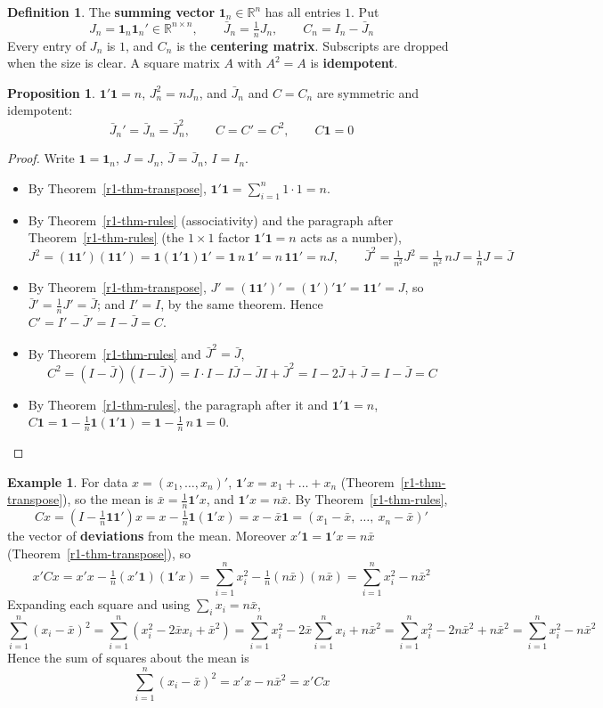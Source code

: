 \documentclass[12pt]{article}
\newcommand{\R}{\mathbb R}
\newcommand{\one}{\mathbf 1}
\theoremstyle{definition}
\newtheorem{proposition}[theorem]{Proposition}
\newtheorem{definition}[theorem]{Definition}
\newtheorem{example}[theorem]{Example}
\begin{document}
\begin{definition}\label{r1-def-ones}
The \textbf{summing vector} \(\one_n\in\R^n\) has all entries \(1\). Put
\[
J_n=\one_n\one_n'\in\R^{n\times n},\qquad \bar J_n=\tfrac1nJ_n,\qquad C_n=I_n-\bar J_n
\]
Every entry of \(J_n\) is \(1\), and \(C_n\) is the \textbf{centering matrix}. Subscripts are
dropped when the size is clear. A square matrix \(A\) with \(A^2=A\) is \textbf{idempotent}.
\end{definition}

\begin{proposition}\label{r1-prop-centering}
\(\one'\one=n\), \(J_n^2=nJ_n\), and \(\bar J_n\) and \(C=C_n\) are symmetric and
idempotent:
\[
\bar J_n'=\bar J_n=\bar J_n^2,\qquad C=C'=C^2,\qquad C\one=0
\]
\end{proposition}
\begin{proof}
Write \(\one=\one_n\), \(J=J_n\), \(\bar J=\bar J_n\), \(I=I_n\).
\begin{itemize}
\item By Theorem~\ref{r1-thm-transpose}, \(\one'\one=\sum_{i=1}^n1\cdot1=n\).
\item By Theorem~\ref{r1-thm-rules} (associativity) and the paragraph after Theorem~\ref{r1-thm-rules} (the
\(1\times1\) factor \(\one'\one=n\) acts as a number),
\[
J^2=(\one\one')(\one\one')=\one(\one'\one)\one'=\one\,n\,\one'=n\,\one\one'=nJ,\qquad
\bar J^2=\tfrac1{n^2}J^2=\tfrac1{n^2}\,nJ=\tfrac1nJ=\bar J
\]
\item By Theorem~\ref{r1-thm-transpose}, \(J'=(\one\one')'=(\one')'\one'=\one\one'=J\), so
\(\bar J'=\frac1nJ'=\bar J\); and \(I'=I\), by the same theorem. Hence \(C'=I'-\bar J'=I-\bar J=C\).
\item By Theorem~\ref{r1-thm-rules} and \(\bar J^2=\bar J\),
\[
C^2=(I-\bar J)(I-\bar J)=I\cdot I-I\bar J-\bar JI+\bar J^2=I-2\bar J+\bar J=I-\bar J=C
\]
\item By Theorem~\ref{r1-thm-rules}, the paragraph after it and \(\one'\one=n\),
\(C\one=\one-\frac1n\one(\one'\one)=\one-\frac1n\,n\,\one=0\).\qedhere
\end{itemize}
\end{proof}

\begin{example}\label{r1-exm-centering}
For data \(x=(x_1,\dots,x_n)'\), \(\one'x=x_1+\dots+x_n\) (Theorem~\ref{r1-thm-transpose}), so
the mean is \(\bar x=\frac1n\one'x\), and \(\one'x=n\bar x\). By Theorem~\ref{r1-thm-rules},
\[
Cx=(I-\tfrac1n\one\one')x=x-\tfrac1n\one(\one'x)=x-\bar x\one=(x_1-\bar x,\ \dots,\ x_n-\bar x)'
\]
the vector of \textbf{deviations} from the mean. Moreover \(x'\one=\one'x=n\bar x\)
(Theorem~\ref{r1-thm-transpose}), so
\[
x'Cx=x'x-\tfrac1n(x'\one)(\one'x)=\sum_{i=1}^nx_i^2-\tfrac1n(n\bar x)(n\bar x)=\sum_{i=1}^nx_i^2-n\bar x^2
\]
Expanding each square and using \(\sum_ix_i=n\bar x\),
\[
\sum_{i=1}^n(x_i-\bar x)^2=\sum_{i=1}^n(x_i^2-2\bar xx_i+\bar x^2)
=\sum_{i=1}^nx_i^2-2\bar x\sum_{i=1}^nx_i+n\bar x^2
=\sum_{i=1}^nx_i^2-2n\bar x^2+n\bar x^2=\sum_{i=1}^nx_i^2-n\bar x^2
\]
Hence the sum of squares about the mean is
\[
\sum_{i=1}^n(x_i-\bar x)^2=x'x-n\bar x^2=x'Cx
\]
\end{example}
\end{document}
